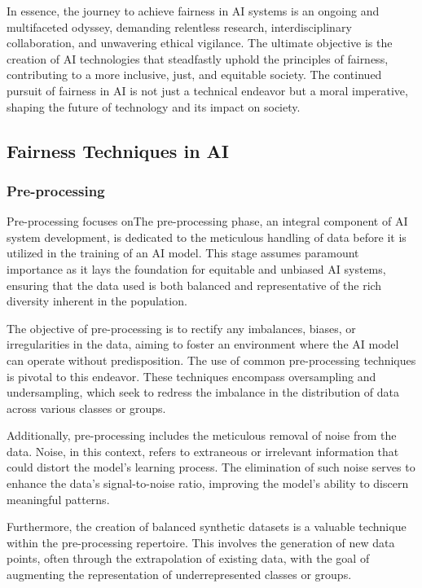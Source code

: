 \documentclass[12pt,a4paper,openright,twoside]{book}
\begin{document}
In essence, the journey to achieve fairness in AI systems is an ongoing and multifaceted odyssey, demanding relentless research, interdisciplinary collaboration, and unwavering ethical vigilance. The ultimate objective is the creation of AI technologies that steadfastly uphold the principles of fairness, contributing to a more inclusive, just, and equitable society. The continued pursuit of fairness in AI is not just a technical endeavor but a moral imperative, shaping the future of technology and its impact on society.
\subsection{Fairness Techniques in AI}

\subsubsection{Pre-processing}
Pre-processing focuses onThe pre-processing phase, an integral component of AI system development, is dedicated to the meticulous handling of data before it is utilized in the training of an AI model. This stage assumes paramount importance as it lays the foundation for equitable and unbiased AI systems, ensuring that the data used is both balanced and representative of the rich diversity inherent in the population. 

The objective of pre-processing is to rectify any imbalances, biases, or irregularities in the data, aiming to foster an environment where the AI model can operate without predisposition. The use of common pre-processing techniques is pivotal to this endeavor. These techniques encompass oversampling and undersampling, which seek to redress the imbalance in the distribution of data across various classes or groups. 

Additionally, pre-processing includes the meticulous removal of noise from the data. Noise, in this context, refers to extraneous or irrelevant information that could distort the model's learning process. The elimination of such noise serves to enhance the data's signal-to-noise ratio, improving the model's ability to discern meaningful patterns. 

Furthermore, the creation of balanced synthetic datasets is a valuable technique within the pre-processing repertoire. This involves the generation of new data points, often through the extrapolation of existing data, with the goal of augmenting the representation of underrepresented classes or groups. 
\end{document}
